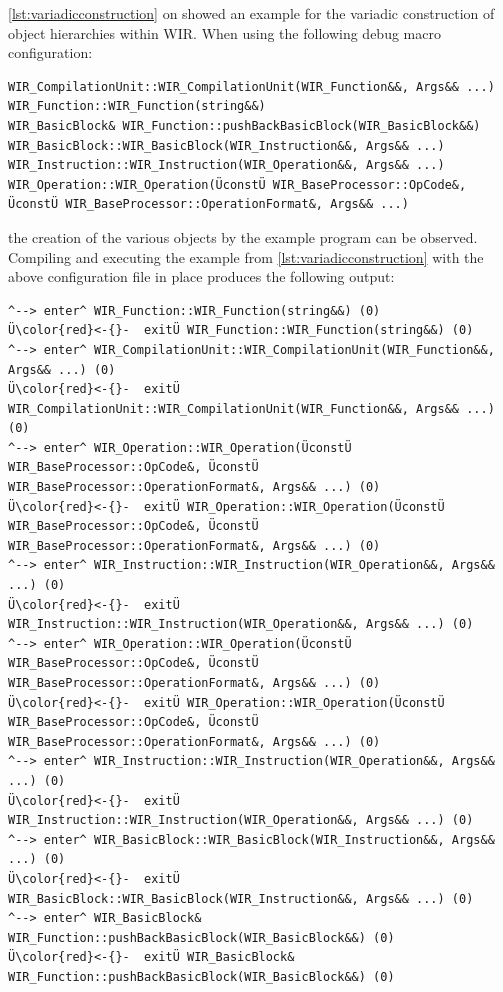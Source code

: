 \cref{lst:variadicconstruction} on  showed an example for the variadic construction of object hierarchies within \gls{WIR}.
When using the following debug macro configuration:
\begin{lstlisting}[style=code]
WIR_CompilationUnit::WIR_CompilationUnit(WIR_Function&&, Args&& ...)
WIR_Function::WIR_Function(string&&)
WIR_BasicBlock& WIR_Function::pushBackBasicBlock(WIR_BasicBlock&&)
WIR_BasicBlock::WIR_BasicBlock(WIR_Instruction&&, Args&& ...)
WIR_Instruction::WIR_Instruction(WIR_Operation&&, Args&& ...)
WIR_Operation::WIR_Operation(ÜconstÜ WIR_BaseProcessor::OpCode&, ÜconstÜ WIR_BaseProcessor::OperationFormat&, Args&& ...)
\end{lstlisting}
the creation of the various objects by the example program can be observed.
Compiling and executing the example from \cref{lst:variadicconstruction} with the above configuration file in place produces the following output:
\begin{lstlisting}[style=code]
^--> enter^ WIR_Function::WIR_Function(string&&) (0)
Ü\color{red}<-{}-  exitÜ WIR_Function::WIR_Function(string&&) (0)
^--> enter^ WIR_CompilationUnit::WIR_CompilationUnit(WIR_Function&&, Args&& ...) (0)
Ü\color{red}<-{}-  exitÜ WIR_CompilationUnit::WIR_CompilationUnit(WIR_Function&&, Args&& ...) (0)
^--> enter^ WIR_Operation::WIR_Operation(ÜconstÜ WIR_BaseProcessor::OpCode&, ÜconstÜ WIR_BaseProcessor::OperationFormat&, Args&& ...) (0)
Ü\color{red}<-{}-  exitÜ WIR_Operation::WIR_Operation(ÜconstÜ WIR_BaseProcessor::OpCode&, ÜconstÜ WIR_BaseProcessor::OperationFormat&, Args&& ...) (0)
^--> enter^ WIR_Instruction::WIR_Instruction(WIR_Operation&&, Args&& ...) (0)
Ü\color{red}<-{}-  exitÜ WIR_Instruction::WIR_Instruction(WIR_Operation&&, Args&& ...) (0)
^--> enter^ WIR_Operation::WIR_Operation(ÜconstÜ WIR_BaseProcessor::OpCode&, ÜconstÜ WIR_BaseProcessor::OperationFormat&, Args&& ...) (0)
Ü\color{red}<-{}-  exitÜ WIR_Operation::WIR_Operation(ÜconstÜ WIR_BaseProcessor::OpCode&, ÜconstÜ WIR_BaseProcessor::OperationFormat&, Args&& ...) (0)
^--> enter^ WIR_Instruction::WIR_Instruction(WIR_Operation&&, Args&& ...) (0)
Ü\color{red}<-{}-  exitÜ WIR_Instruction::WIR_Instruction(WIR_Operation&&, Args&& ...) (0)
^--> enter^ WIR_BasicBlock::WIR_BasicBlock(WIR_Instruction&&, Args&& ...) (0)
Ü\color{red}<-{}-  exitÜ WIR_BasicBlock::WIR_BasicBlock(WIR_Instruction&&, Args&& ...) (0)
^--> enter^ WIR_BasicBlock& WIR_Function::pushBackBasicBlock(WIR_BasicBlock&&) (0)
Ü\color{red}<-{}-  exitÜ WIR_BasicBlock& WIR_Function::pushBackBasicBlock(WIR_BasicBlock&&) (0)
\end{lstlisting}


